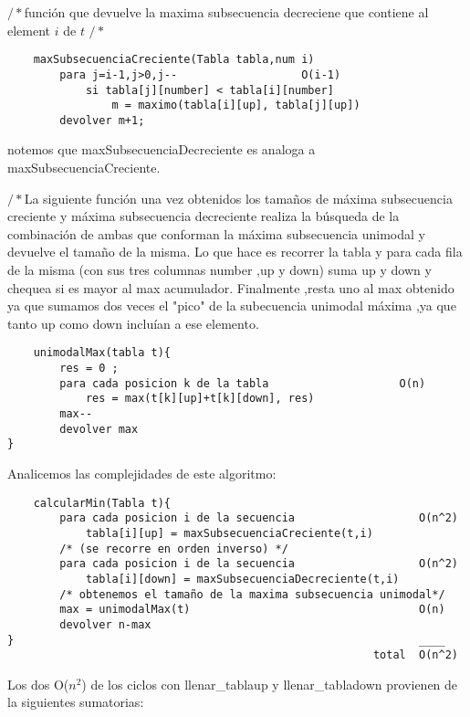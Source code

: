 $/*$función que devuelve la maxima subsecuencia decreciene que contiene al element $i$ de $t$  $/*$

\begin{verbatim}                   
    maxSubsecuenciaCreciente(Tabla tabla,num i)    
        para j=i-1,j>0,j--                   O(i-1)
            si tabla[j][number] < tabla[i][number]
                m = maximo(tabla[i][up], tabla[j][up]) 	
        devolver m+1;
\end{verbatim}    

\newline

notemos que maxSubsecuenciaDecreciente es analoga a maxSubsecuenciaCreciente.

$/*$La siguiente función una vez obtenidos los tamaños de máxima subsecuencia creciente y máxima subsecuencia decreciente realiza la búsqueda de la combinación de ambas que conforman la máxima subsecuencia unimodal y devuelve el tamaño de la misma.
Lo que hace es recorrer la tabla y para cada fila de la misma (con sus tres columnas number ,up y down) suma up y down y chequea si es mayor al max acumulador.
Finalmente ,resta uno al max obtenido ya que sumamos dos veces el "pico" de la subecuencia unimodal máxima ,ya que tanto up como down incluían a ese elemento. 

\begin{verbatim}
    unimodalMax(tabla t){
        res = 0 ;
        para cada posicion k de la tabla                    O(n)
            res = max(t[k][up]+t[k][down], res)
        max--
        devolver max
}
\end{verbatim}


Analicemos las complejidades de este algoritmo:

\begin{verbatim}
    calcularMin(Tabla t){
        para cada posicion i de la secuencia                   O(n^2)
            tabla[i][up] = maxSubsecuenciaCreciente(t,i)
        /* (se recorre en orden inverso) */
        para cada posicion i de la secuencia                   O(n^2)  
            tabla[i][down] = maxSubsecuenciaDecreciente(t,i)
        /* obtenemos el tamaño de la maxima subsecuencia unimodal*/   
        max = unimodalMax(t)                                   O(n)  
        devolver n-max
}                                                              ____
                                                        total  O(n^2)
\end{verbatim}

Los dos O($n^{2}$) de los ciclos con llenar\_tablaup y llenar\_tabladown provienen de la siguientes sumatorias:

